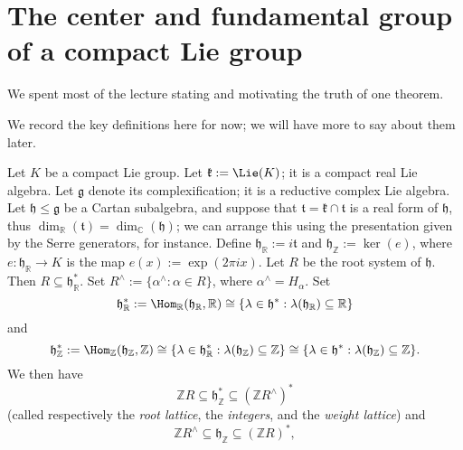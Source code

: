 \documentclass[reqno]{amsart} 
\begin{document}
\section{The center and fundamental group of a compact Lie group\label{sec:center-pi1-compact}}
\label{sec:orge2e02c5}
We spent most of the lecture stating and motivating the truth of one theorem.

We record the key definitions here for now; we will have more to say about them later.

Let $K$ be a compact Lie group.  Let $\mathfrak{k} := \Lie(K)$; it is a compact real Lie algebra.  Let $\mathfrak{g}$ denote its complexification; it is a reductive complex Lie algebra.  Let $\mathfrak{h} \leq \mathfrak{g}$ be a Cartan subalgebra, and suppose that $\mathfrak{t} = \mathfrak{k} \cap \mathfrak{t}$ is a real form of $\mathfrak{h}$, thus $\dim_\mathbb{R}(\mathfrak{t}) = \dim_\mathbb{C}(\mathfrak{h})$; we can arrange this using the presentation given by the Serre generators, for instance.  Define $\mathfrak{h}_\mathbb{R} := i \mathfrak{t}$ and $\mathfrak{h}_\mathbb{Z} := \ker(e)$, where $e : \mathfrak{h}_\mathbb{R} \rightarrow K$ is the map $e(x) := \exp(2 \pi i x)$.  Let $R$ be the root system of $\mathfrak{h}$.  Then $R \subseteq \mathfrak{h}_\mathbb{R}^*$.  Set $R^\wedge := \{\alpha^\wedge : \alpha \in R\}$, where $\alpha^\wedge = H_\alpha$.  Set
\begin{equation*}
  \mathfrak{h}_\mathbb{R}^* := \Hom_\mathbb{R}(\mathfrak{h}_\mathbb{R},\mathbb{R}) \cong \{\lambda \in \mathfrak{h}^* : \lambda(\mathfrak{h}_\mathbb{R}) \subseteq \mathbb{R} \}
\end{equation*}
and
\begin{equation*}
  \mathfrak{h}_\mathbb{Z}^* := \Hom_\mathbb{Z}(\mathfrak{h}_\mathbb{Z},\mathbb{Z}) \cong \{\lambda \in \mathfrak{h}_{\mathbb{R}}^* : \lambda(\mathfrak{h}_\mathbb{Z}) \subseteq \mathbb{Z} \} \cong \{\lambda \in \mathfrak{h}^* : \lambda(\mathfrak{h}_\mathbb{Z}) \subseteq \mathbb{Z} \}.
\end{equation*}
We then have
\begin{equation}
  \mathbb{Z} R
  \subseteq \mathfrak{h}_\mathbb{Z}^*
  \subseteq (\mathbb{Z} R^\wedge)^*
\end{equation}
(called respectively the \emph{root lattice}, the \emph{integers}, and the \emph{weight lattice}) and
\begin{equation}
  \mathbb{Z} R^\wedge
  \subseteq \mathfrak{h}_\mathbb{Z}
  \subseteq (\mathbb{Z} R)^*,
\end{equation}
\end{document}
